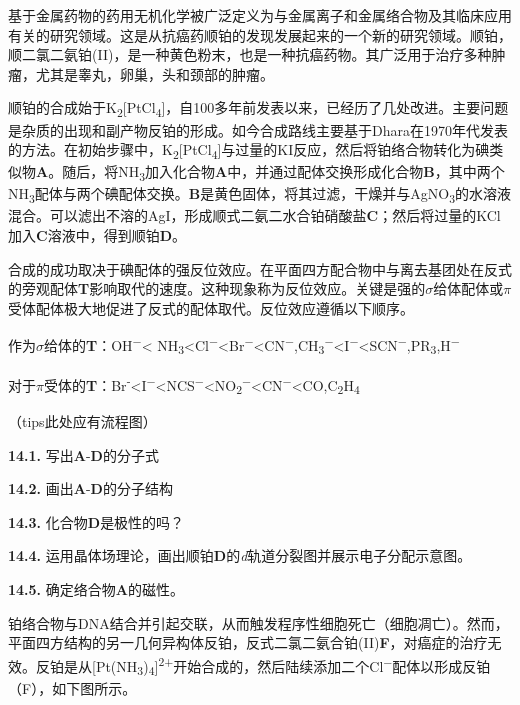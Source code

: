 基于金属药物的药用无机化学被广泛定义为与金属离子和金属络合物及其临床应用有关的研究领域。这是从抗癌药顺铂的发现发展起来的一个新的研究领域。顺铂，顺二氯二氨铂(II)，是一种黄色粉末，也是一种抗癌药物。其广泛用于治疗多种肿瘤，尤其是睾丸，卵巢，头和颈部的肿瘤。

顺铂的合成始于K\textsubscript{2}[PtCl\textsubscript{4}]，自100多年前发表以来，已经历了几处改进。主要问题是杂质的出现和副产物反铂的形成。如今合成路线主要基于Dhara在1970年代发表的方法。在初始步骤中，K\textsubscript{2}[PtCl\textsubscript{4}]与过量的KI反应，然后将铂络合物转化为碘类似物\textbf{A}。随后，将NH\textsubscript{3}加入化合物\textbf{A}中，并通过配体交换形成化合物\textbf{B}，其中两个NH\textsubscript{3}配体与两个碘配体交换。\textbf{B}是黄色固体，将其过滤，干燥并与AgNO\textsubscript{3}的水溶液混合。可以滤出不溶的AgI，形成顺式二氨二水合铂硝酸盐\textbf{C}；然后将过量的KCl加入\textbf{C}溶液中，得到顺铂\textbf{D}。

合成的成功取决于碘配体的强反位效应。在平面四方配合物中与离去基团处在反式的旁观配体\textbf{T}影响取代的速度。这种现象称为反位效应。关键是强的$\sigma$给体配体或$\pi$受体配体极大地促进了反式的配体取代。反位效应遵循以下顺序。

作为$\sigma$给体的\textbf{T}：OH\textsuperscript{−}< NH\textsubscript{3}<Cl\textsuperscript{−}<Br\textsuperscript{−}<CN\textsuperscript{−},CH\textsubscript{3}\textsuperscript{−}<I\textsuperscript{−}<SCN\textsuperscript{−},PR\textsubscript{3},H\textsuperscript{−}

对于$\pi$受体的\textbf{T}：Br\textsuperscript{‑}<I\textsuperscript{−}<NCS\textsuperscript{−}<NO\textsubscript{2}\textsuperscript{−}<CN\textsuperscript{−}<CO,C\textsubscript{2}H\textsubscript{4}

（tips此处应有流程图）

\noindent\textbf{14.1.} 写出\textbf{A}-\textbf{D}的分子式

\noindent\textbf{14.2.} 画出\textbf{A}-\textbf{D}的分子结构

\noindent\textbf{14.3.} 化合物\textbf{D}是极性的吗？

\noindent\textbf{14.4.} 运用晶体场理论，画出顺铂\textbf{D}的\textit{d}轨道分裂图并展示电子分配示意图。

\noindent\textbf{14.5.} 确定络合物\textbf{A}的磁性。

铂络合物与DNA结合并引起交联，从而触发程序性细胞死亡（细胞凋亡）。然而，平面四方结构的另一几何异构体反铂，反式二氯二氨合铂(II)\textbf{F}，对癌症的治疗无效。反铂是从[Pt(NH\textsubscript{3})\textsubscript{4}]\textsuperscript{2+}开始合成的，然后陆续添加二个Cl\textsuperscript{−}配体以形成反铂（F），如下图所示。

